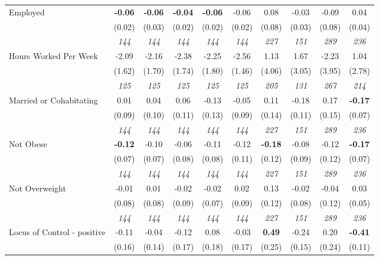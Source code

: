 \begin{tabular}{l c c c c c c c c c}
Employed & \textbf{ -0.06 } & \textbf{ -0.06 } & \textbf{ -0.04 } & \textbf{-0.06} & -0.06 & 0.08 & -0.03 & -0.09 & 0.04 \\
& (0.02) & (0.03) & (0.02) & (0.02) & (0.02) & (0.08) & (0.03) & (0.08) & (0.04) \\
& \textit{ 144 } & \textit{ 144 } & \textit{ 144 } & \textit{ 144 } & \textit{ 144 } & \textit{ 227 } & \textit{ 151 } & \textit{ 289 } & \textit{ 236 } \\
Hours Worked Per Week & -2.09 & -2.16 & -2.38 & -2.25 & -2.56 & 1.13 & 1.67 & -2.23 & 1.04 \\
& (1.62) & (1.70) & (1.74) & (1.80) & (1.46) & (4.06) & (3.05) & (3.95) & (2.78) \\
& \textit{ 125 } & \textit{ 125 } & \textit{ 125 } & \textit{ 125 } & \textit{ 125 } & \textit{ 205 } & \textit{ 131 } & \textit{ 267 } & \textit{ 214 } \\
Married or Cohabitating & 0.01 & 0.04 & 0.06 & -0.13 & -0.05 & 0.11 & -0.18 & 0.17 & \textbf{-0.17} \\
& (0.09) & (0.10) & (0.11) & (0.13) & (0.09) & (0.14) & (0.11) & (0.15) & (0.07) \\
& \textit{ 144 } & \textit{ 144 } & \textit{ 144 } & \textit{ 144 } & \textit{ 144 } & \textit{ 227 } & \textit{ 151 } & \textit{ 289 } & \textit{ 236 } \\
Not Obese & \textbf{ -0.12 } & -0.10 & -0.06 & -0.11 & -0.12 & \textbf{ -0.18 } & -0.08 & -0.12 & \textbf{-0.17} \\
& (0.07) & (0.07) & (0.08) & (0.08) & (0.11) & (0.12) & (0.09) & (0.12) & (0.07) \\
& \textit{ 144 } & \textit{ 144 } & \textit{ 144 } & \textit{ 144 } & \textit{ 144 } & \textit{ 227 } & \textit{ 151 } & \textit{ 289 } & \textit{ 236 } \\
Not Overweight & -0.01 & 0.01 & -0.02 & -0.02 & 0.02 & 0.13 & -0.02 & -0.04 & 0.03 \\
& (0.08) & (0.08) & (0.09) & (0.07) & (0.09) & (0.12) & (0.08) & (0.12) & (0.05) \\
& \textit{ 144 } & \textit{ 144 } & \textit{ 144 } & \textit{ 144 } & \textit{ 144 } & \textit{ 227 } & \textit{ 151 } & \textit{ 289 } & \textit{ 236 } \\
Locus of Control - positive & -0.11 & -0.04 & -0.12 & 0.08 & -0.03 & \textbf{ 0.49 } & -0.24 & 0.20 & \textbf{-0.41} \\
& (0.16) & (0.14) & (0.17) & (0.18) & (0.17) & (0.25) & (0.15) & (0.24) & (0.11) \\

\end{tabular}
